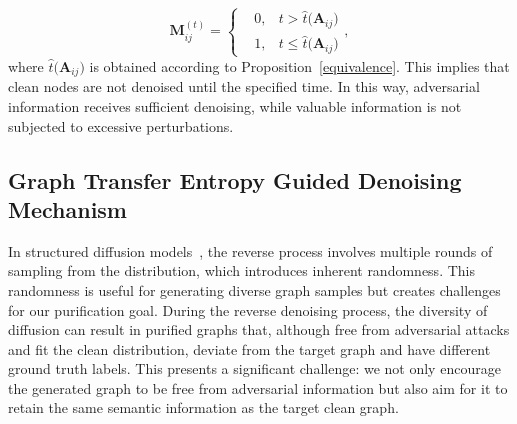 \begin{equation}
\label{equation_mask}
\mathbf{M}^{(t)}_{ij} = \left \{
\begin{aligned}
    &0,  &t > \hat{t}\big(\mathbf{A}_{ij}\big)\\
    &1,  &t \leq \hat{t}\big(\mathbf{A}_{ij}\big)
\end{aligned}
\right. ,
\end{equation}
where $\hat{t}\big(\mathbf{A}_{ij}\big)$ is obtained according to Proposition~\ref{equivalence}. This implies that clean nodes are not denoised until the specified time. In this way, adversarial information receives sufficient denoising, while valuable information is not subjected to excessive perturbations.

\subsection{Graph Transfer Entropy Guided Denoising Mechanism}
\label{method:part3}
In structured diffusion models~\cite{austin2021structured}, the reverse process involves multiple rounds of sampling from the distribution, which introduces inherent randomness. 
This randomness is useful for generating diverse graph samples but creates challenges for our purification goal.
During the reverse denoising process, the diversity of diffusion can result in purified graphs that, although free from adversarial attacks and fit the clean distribution, deviate from the target graph and have different ground truth labels. 
This presents a significant challenge: we not only encourage the generated graph to be free from adversarial information but also aim for it to retain the same semantic information as the target clean graph.

